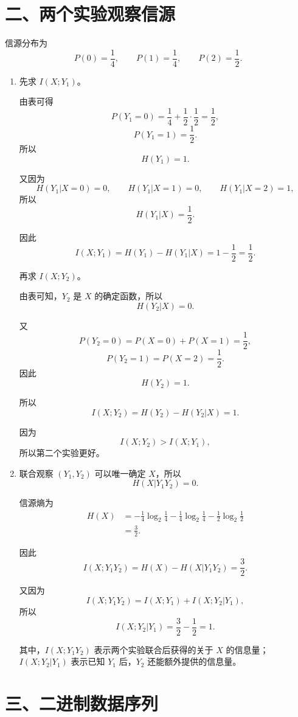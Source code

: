 \documentclass[UTF8,a4paper,12pt]{ctexart}
\begin{document}
\section*{二、两个实验观察信源}

信源分布为
\[
P(0)=\frac14,\qquad P(1)=\frac14,\qquad P(2)=\frac12.
\]

\begin{enumerate}[label=\arabic*., leftmargin=2em]
\item 先求 $I(X;Y_1)$。

由表可得
\[
P(Y_1=0)=\frac14+\frac12\cdot\frac12=\frac12,
\]
\[
P(Y_1=1)=\frac12.
\]
所以
\[
H(Y_1)=1.
\]

又因为
\[
H(Y_1|X=0)=0,\qquad H(Y_1|X=1)=0,\qquad H(Y_1|X=2)=1,
\]
所以
\[
H(Y_1|X)=\frac12.
\]

因此
\[
I(X;Y_1)=H(Y_1)-H(Y_1|X)
=1-\frac12=\frac12.
\]

再求 $I(X;Y_2)$。

由表可知，$Y_2$ 是 $X$ 的确定函数，所以
\[
H(Y_2|X)=0.
\]

又
\[
P(Y_2=0)=P(X=0)+P(X=1)=\frac12,
\]
\[
P(Y_2=1)=P(X=2)=\frac12.
\]
因此
\[
H(Y_2)=1.
\]

所以
\[
I(X;Y_2)=H(Y_2)-H(Y_2|X)=1.
\]

因为
\[
I(X;Y_2)>I(X;Y_1),
\]
所以第二个实验更好。

\item 联合观察 $(Y_1,Y_2)$ 可以唯一确定 $X$，所以
\[
H(X|Y_1Y_2)=0.
\]

信源熵为
\[
\begin{aligned}
H(X)
&=-\frac14\log_2\frac14-\frac14\log_2\frac14-\frac12\log_2\frac12\\
&=\frac32.
\end{aligned}
\]

因此
\[
I(X;Y_1Y_2)=H(X)-H(X|Y_1Y_2)=\frac32.
\]

又因为
\[
I(X;Y_1Y_2)=I(X;Y_1)+I(X;Y_2|Y_1),
\]
所以
\[
I(X;Y_2|Y_1)=\frac32-\frac12=1.
\]

其中，$I(X;Y_1Y_2)$ 表示两个实验联合后获得的关于 $X$ 的信息量；
$I(X;Y_2|Y_1)$ 表示已知 $Y_1$ 后，$Y_2$ 还能额外提供的信息量。
\end{enumerate}

\section*{三、二进制数据序列}
\end{document}
